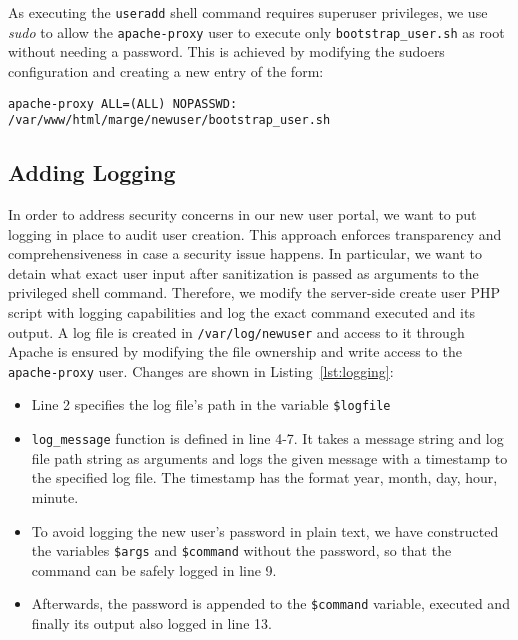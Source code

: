 As executing the \texttt{useradd} shell command requires superuser privileges,
we use \textit{sudo} to allow the \texttt{apache-proxy} user to execute only
\texttt{bootstrap\_user.sh} as root without needing a password. This is achieved
by modifying the sudoers configuration and creating a new entry of the form:

\begin{lstlisting}[frame=single]
    apache-proxy ALL=(ALL) NOPASSWD: /var/www/html/marge/newuser/bootstrap_user.sh
\end{lstlisting}


\subsection{Adding Logging}\label{section:logging}

In order to address security concerns in our new user portal, we want to put
logging in place to audit user creation. This approach enforces transparency and
comprehensiveness in case a security issue happens. In particular, we want to
detain what exact user input after sanitization is passed as arguments to the
privileged shell command. Therefore, we modify the server-side create user PHP
script with logging capabilities and log the exact command executed and its
output. A log file is created in \texttt{/var/log/newuser} and access to it
through Apache is ensured by modifying the file ownership and write access to
the \texttt{apache-proxy} user. Changes are shown in Listing~\ref{lst:logging}:

\begin{itemize}
    \item Line 2 specifies the log file's path in the variable
    \texttt{\$logfile}
    \item \texttt{log\_message} function is defined in line 4-7. It takes a
    message string and log file path string as arguments and logs the given
    message with a timestamp to the specified log file. The timestamp has the
    format year, month, day, hour, minute.
    \item To avoid logging the new user's password in plain text, we have
    constructed the variables \texttt{\$args} and \texttt{\$command} without the
    password, so that the command can be safely logged in line 9.
    \item Afterwards, the password is appended to the \texttt{\$command}
    variable, executed and finally its output also logged in line 13.
\end{itemize}

